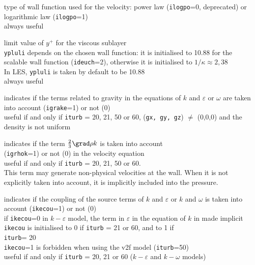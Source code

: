 {type of wall function used for the velocity: power law
({\tt ilogpo}=0, deprecated) or logarithmic law ({\tt ilogpo}=1)\\
always useful}

{limit value of $y^+$ for the viscous sublayer\\
{\tt ypluli} depends on the chosen wall function: it is
initialised to 10.88 for the scalable wall function ({\tt ideuch}=2),
otherwise it is initialised to $1/\kappa\approx 2,38$\\
In LES, {\tt ypluli} is taken by default to be 10.88\\
always useful}


{indicates if the terms related to gravity in the
equations of $k$ and $\varepsilon$ or $\omega$ are taken into account
({\tt igrake}=1) or not (0)\\
useful if and only if {\tt iturb} = 20, 21, 50 or 60, ({\tt gx, gy, gz})
$\ne$ (0,0,0) and the density is not uniform}

{indicates if the term $\frac{2}{3}\grad \rho k$
is taken into account\\ ({\tt igrhok}=1) or not (0) in the velocity
equation\\
useful if and only if {\tt iturb} = 20, 21, 50 or 60.\\
This term may generate
non-physical velocities at the wall. When it is not explicitly taken into
account, it is implicitly included into the pressure.}

{indicates if the coupling of the source terms of
$k$ and $\varepsilon$ or $k$ and $\omega$ is taken into account
({\tt ikecou}=1) or not (0)\\
if {\tt ikecou}=0 in $k-\varepsilon$ model, the term in $\varepsilon$ in the
equation of $k$ in made implicit\\
{\tt ikecou} is initialised to 0 if {\tt iturb} = 21 or 60,
and to 1 if\\
{\tt iturb}= 20\\
{\tt ikecou}=1 is forbidden when using the v2f model
({\tt iturb}=50)\\
useful if and only if {\tt iturb} = 20, 21 or 60 ($k-\varepsilon$ and
$k-\omega$ models)}

